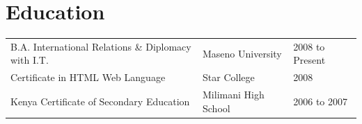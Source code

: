 \documentclass[10pt,a4paper]{article}
\begin{document}
\vspace{0.3em}
\section{Education}

\begin{tabular}{l l l}
  B.A. International Relations \& Diplomacy with I.T. & Maseno University & 2008 to Present \\
  Certificate in HTML Web Language & Star College & 2008 \\
  Kenya Certificate of Secondary Education & Milimani High School & 2006 to 2007
\end{tabular}
\end{document}
